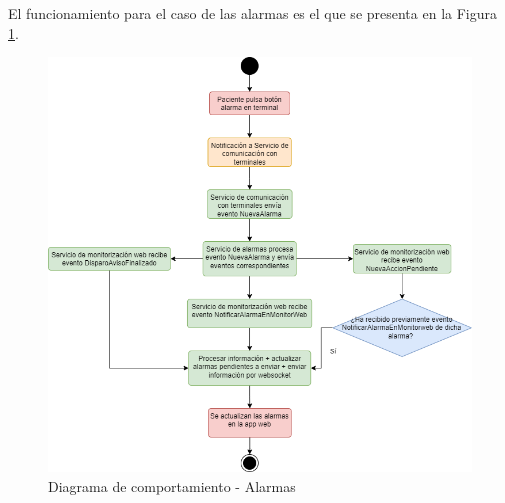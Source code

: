 El funcionamiento para el caso de las alarmas es el que se presenta en la Figura \ref{fig:flujograma-alarmas}.

\begin{figure}[H]
    \centering
    \includegraphics[width=15cm]{Imagenes/Flujograma-alarmas.png}
    \caption{Diagrama de comportamiento - Alarmas}
    \label{fig:flujograma-alarmas}
\end{figure}

